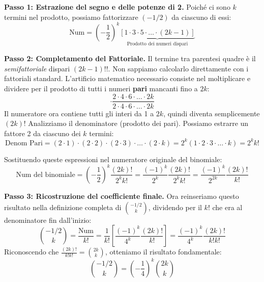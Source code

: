 \textbf{Passo 1: Estrazione del segno e delle potenze di 2.}
Poiché ci sono $k$ termini nel prodotto, possiamo fattorizzare $(-1/2)$ da ciascuno di essi:
\begin{equation}
    \text{Num} = \left(-\frac{1}{2}\right)^k \underbrace{\left[ 1 \cdot 3 \cdot 5 \cdot \dots \cdot (2k-1) \right]}_{\text{Prodotto dei numeri dispari}}
\end{equation}

\textbf{Passo 2: Completamento del Fattoriale.}
Il termine tra parentesi quadre è il \textit{semifattoriale} dispari $(2k-1)!!$. Non sappiamo calcolarlo direttamente con i fattoriali standard.
L'artificio matematico necessario consiste nel moltiplicare e dividere per il prodotto di tutti i numeri \textbf{pari} mancanti fino a $2k$:
\begin{equation}
    [1 \cdot 3 \cdot \dots \cdot (2k-1)] \cdot \frac{2 \cdot 4 \cdot 6 \cdot \dots \cdot 2k}{2 \cdot 4 \cdot 6 \cdot \dots \cdot 2k}
\end{equation}
Il numeratore ora contiene tutti gli interi da 1 a $2k$, quindi diventa semplicemente $(2k)!$
Analizziamo il denominatore (prodotto dei pari). Possiamo estrarre un fattore 2 da ciascuno dei $k$ termini:
\begin{equation}
    \text{Denom Pari} = (2\cdot 1) \cdot (2\cdot 2) \cdot (2\cdot 3) \cdot \dots \cdot (2\cdot k) = 2^k (1 \cdot 2 \cdot 3 \cdot \dots \cdot k) = 2^k k!
\end{equation}

Sostituendo queste espressioni nel numeratore originale del binomiale:
\begin{equation}
    \text{Num del binomiale} = \left(-\frac{1}{2}\right)^k \frac{(2k)!}{2^k k!} = \frac{(-1)^k}{2^k} \frac{(2k)!}{2^k k!} = \frac{(-1)^k}{2^{2k}} \frac{(2k)!}{k!}
\end{equation}

\textbf{Passo 3: Ricostruzione del coefficiente finale.}
Ora reinseriamo questo risultato nella definizione completa di $\binom{-1/2}{k}$, dividendo per il $k!$ che era al denominatore fin dall'inizio:
\begin{equation}
    \binom{-1/2}{k} = \frac{\text{Num}}{k!} = \frac{1}{k!} \left[ \frac{(-1)^k}{4^k} \frac{(2k)!}{k!} \right] = \frac{(-1)^k}{4^k} \frac{(2k)!}{k! k!}
\end{equation}
Riconoscendo che $\frac{(2k)!}{k! k!} = \binom{2k}{k}$, otteniamo il risultato fondamentale:
\begin{equation}
    \binom{-1/2}{k} = \left(-\frac{1}{4}\right)^k \binom{2k}{k}
\end{equation}


